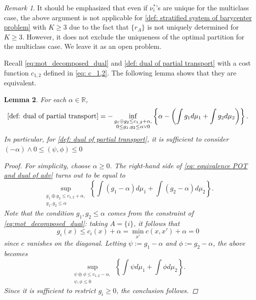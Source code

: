 \documentclass{amsart}
\theoremstyle{plain}
\numberwithin{equation}{section}\newtheorem{theorem}{Theorem}[section]
\newtheorem{lemma}[theorem]{Lemma}
\theoremstyle{remark}
\newtheorem{remark}[theorem]{Remark}
\begin{document}
\begin{remark}
It should be emphasized that even if $\nu^*_i$'s are unique for the multiclass case, the above argument is not applicable for \eqref{def: stratified system of barycenter problem} with $K \geq 3$ due to the fact that $\{r_A\}$ is not uniquely determined for $K \geq 3$. However, it does not exclude the uniqueness of the optimal partition for the multiclass case. We leave it as an open problem.
\end{remark}








Recall \eqref{eq:mot_decomposed_dual} and \eqref{def: dual of partial transport} with a cost function $c_{1,2}$ defined in \eqref{eq: c_1,2}. The following lemma shows that they are equivalent.





\begin{lemma}\label{lemma: dual partial tranport = dual of adv}
For each $\alpha \in \mathbb{R}$,
\begin{align}\label{eq: equivalence POT and dual of adv}
    \eqref{def: dual of partial transport} =   - \inf_{\substack{ g_1 \oplus g_2 \leq c_{1,2} + \alpha,   \\ 0 \leq g_1, g_2 \leq \alpha \vee 0}} \left\{ \alpha - \left(\int g_1 d\mu_1 + \int g_2 d\mu_2 \right) \right\}. 
\end{align}
In particular, for \eqref{def: dual of partial transport}, it is sufficient to consider $(-\alpha) \wedge 0 \leq (\psi, \phi) \leq 0$ 


\begin{proof}
For simplicity, choose $\alpha \geq 0$. The right-hand side of \eqref{eq: equivalence POT and dual of adv} turns out to be equal to
\[
    \sup_{\substack{ g_1 \oplus g_2 \leq c_{1,2} + \alpha,   \\  g_1, g_2 \leq \alpha}} \left\{ \int (g_1 - \alpha) d\mu_1 + \int (g_2 - \alpha) d\mu_2 \right\}.
\]
Note that the condition $g_1, g_2 \leq \alpha$ comes from the constraint of \eqref{eq:mot_decomposed_dual}: taking $A =\{i \}$, it follows that
\[
    g_i(x) \leq c_{i}(x) + \alpha = \min_{x'} c(x,x')+ \alpha = 0
\]
since $c$ vanishes on the diagonal. Letting $\psi := g_1 - \alpha$ and $\phi:=g_2 - \alpha$, the above becomes
\[
    \sup_{\substack{ \psi \oplus \phi \leq c_{1,2} - \alpha,   \\ \psi, \phi \leq 0}} \left\{ \int \psi d\mu_1 + \int \phi d\mu_2 \right\}.
\]
Since it is sufficient to restrict $g_i \geq 0$, the conclusion follows.
\end{proof}
\end{lemma}
\end{document}
